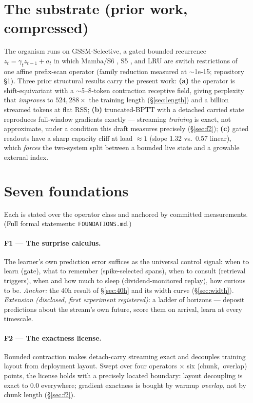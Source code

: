 \documentclass[11pt]{article}
\theoremstyle{definition}
\newcommand{\code}[1]{\texttt{#1}}
\begin{document}
\section{The substrate (prior work, compressed)}

The organism runs on GSSM-Selective, a gated bounded recurrence
$z_t = \gamma_t z_{t-1} + a_t$ in which Mamba/S6 \cite{gu2023mamba}, S5
\cite{smith2023s5}, and LRU \cite{orvieto2023lru} are switch restrictions of
one affine prefix-scan operator (family reduction measured at $\sim$1e-15;
repository \S 1). Three prior structural results carry the present work:
\textbf{(a)} the operator is shift-equivariant with a $\sim$5--8-token
contraction receptive field, giving perplexity that \emph{improves} to
$524{,}288\times$ the training length (\S\ref{sec:length}) and a billion
streamed tokens at flat RSS; \textbf{(b)} truncated-BPTT with a detached
carried state reproduces full-window gradients exactly --- streaming
\emph{training} is exact, not approximate, under a condition this draft
measures precisely (\S\ref{sec:f2}); \textbf{(c)} gated readouts have a sharp
capacity cliff at load $\approx 1$ (slope 1.32 vs.\ 0.57 linear), which
\emph{forces} the two-system split between a bounded live state and a
growable external index.

\section{Seven foundations}

Each is stated over the operator class and anchored by committed
measurements. (Full formal statements: \code{FOUNDATIONS.md}.)

\paragraph{F1 --- The surprise calculus.} The learner's own prediction error
suffices as the universal control signal: when to learn (gate), what to
remember (spike-selected spans), when to consult (retrieval triggers), when
and how much to sleep (dividend-monitored replay), how curious to be.
\emph{Anchor:} the 40h result of \S\ref{sec:40h} and its width curve
(\S\ref{sec:width}). \emph{Extension (disclosed, first experiment
registered):} a ladder of horizons --- deposit predictions about the
stream's own future, score them on arrival, learn at every timescale.

\paragraph{F2 --- The exactness license.} Bounded contraction makes
detach-carry streaming exact and decouples training layout from deployment
layout. Swept over four operators $\times$ six (chunk,~overlap) points, the
license holds with a precisely located boundary: layout decoupling is exact
to 0.0 everywhere; gradient exactness is bought by warmup \emph{overlap}, not
by chunk length (\S\ref{sec:f2}).
\end{document}
